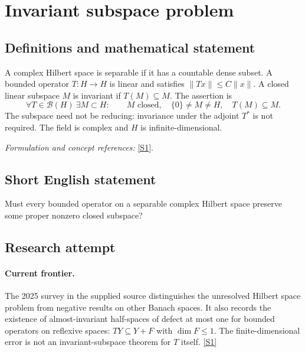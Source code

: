 \documentclass[11pt,a4paper]{article}
\newcommand{\sref}[2]{\hyperlink{source:#1:#2}{[S#2]}}
\newif\ifshowcatalogue
\newcommand{\cataloguescope}[1]{\ifshowcatalogue
 \paragraph{Exact scope in the supplied catalogue.}
 \begin{quote}\small #1\end{quote}\fi}
\numberwithin{equation}{section}
\begin{document}
\setcounter{section}{0}
\clearpage
\section*{\texorpdfstring{Invariant subspace problem}{Invariant subspace problem}}\label{statement}
\subsection{Definitions and mathematical statement}
A complex Hilbert space is separable if it has a countable dense subset. A bounded operator $T:H\to H$ is linear and satisfies $\|Tx\|\le C\|x\|$. A closed linear subspace $M$ is invariant if $T(M)\subseteq M$. The assertion is
\[
 \forall T\in\mathcal B(H)\ \exists M\subset H:\qquad
 M\text{ closed},\quad\{0\}\ne M\ne H,\quad T(M)\subseteq M.
\]
The subspace need not be reducing: invariance under the adjoint $T^*$ is not required. The field is complex and $H$ is infinite-dimensional.
\par\smallskip\textit{Formulation and concept references:} \sref{statement}{1}.
\cataloguescope{Does every bounded linear operator T on an infinite-dimensional separable complex Hilbert space H have a nontrivial closed invariant subspace, that is, a closed subspace M with \{0\} != M != H such that T(M) is a subset of M?}
\subsection{Short English statement}
Must every bounded operator on a separable complex Hilbert space preserve some proper nonzero closed subspace?
\subsection{Research attempt}

\paragraph{Current frontier.}
The 2025 survey in the supplied source distinguishes the unresolved Hilbert
space problem from negative results on other Banach spaces. It also records
the existence of almost-invariant half-spaces of defect at most one for
bounded operators on reflexive spaces: $TY\subseteq Y+F$ with
$\dim F\leq1$. The finite-dimensional error is not an invariant-subspace
theorem for $T$ itself. \sref{statement}{1}
\end{document}
